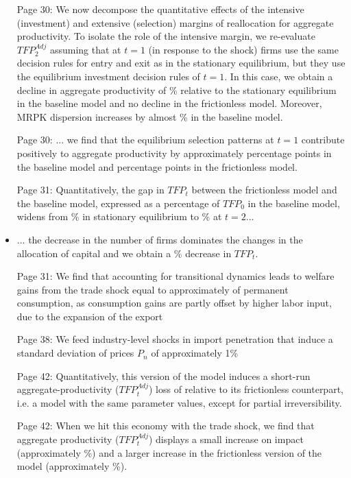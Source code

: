 \documentclass[12pt]{article}
\begin{document}
\begin{itemize}
	\item [Page 30:] We now decompose the quantitative effects of the intensive (investment) and extensive (selection) margins of reallocation for aggregate productivity. To isolate the role of the intensive margin, we re-evaluate $TFP_2^{Adj}$ assuming that at $t=1$ (in response to the shock) firms use the same decision rules for entry and exit as in the stationary equilibrium, but they use the equilibrium investment decision rules of $t=1$. In this case, we obtain a decline in aggregate productivity of \TFPdBaselineKpr\% relative to the stationary equilibrium in the baseline model and no decline in the frictionless model. Moreover, MRPK dispersion increases by almost \TFPdBaselineMRPK\% in the baseline model.
	\item [Page 30:] ... we find that the equilibrium selection patterns at $t=1$ contribute positively to aggregate productivity by approximately \TFPdBaselineExt \space percentage points in the baseline model and \TFPdFrictionless \space percentage points in the frictionless model.
	\item [Page 31:] Quantitatively, the gap in $TFP_t$ between the frictionless model and the baseline model, expressed as a percentage of $TFP_0$ in the baseline model, widens from \ssTFPratioU\% in stationary equilibrium to \SRTFPratioU\% at $t=2$...
	\item ... the decrease in the number of firms dominates the changes in the allocation of capital and we obtain a \tfpgainsLRU\% decrease in $TFP_t$.
	\item [Page 31:] We find that accounting for transitional dynamics leads to welfare gains from the trade shock equal to approximately \cev \space of permanent consumption, as consumption gains are partly offset by higher labor input, due to the expansion of the export
	\item [Page 38:] We feed industry-level shocks in import penetration that induce a standard deviation of prices $P_n$ of approximately 1\%
	\item [Page 42:] Quantitatively, this version of the model induces a short-run aggregate-productivity ($TFP_t^{Adj}$) loss of \effgapSRNC \space  relative to its frictionless counterpart, i.e. a model with the same parameter values, except for partial irreversibility.
	\item [Page 42:] When we hit this economy with the trade shock, we find that aggregate productivity ($TFP_t^{Adj}$) displays a small increase on impact (approximately \TFPdNoEta\%) and a larger increase in the frictionless version of the model (approximately \TFPdNoEtaFrictionless\%). 

\end{itemize}
\end{document}
